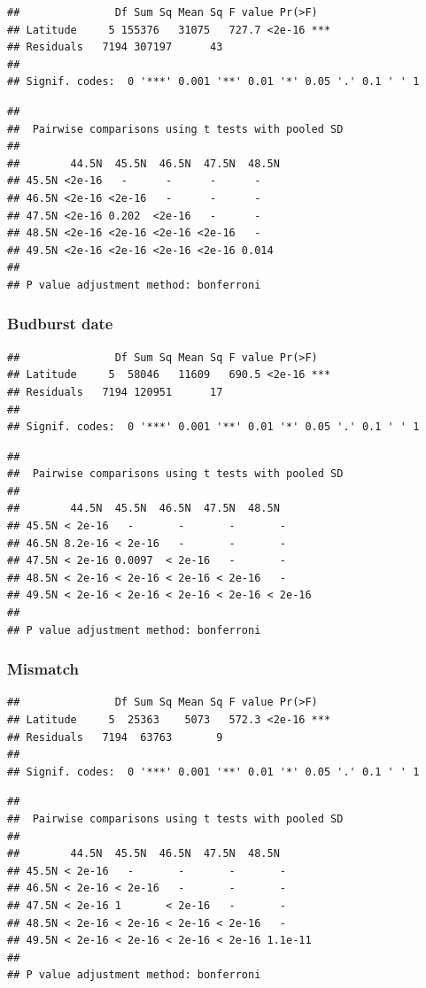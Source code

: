 \documentclass[12 pt]{article}
\begin{document}
\begin{verbatim}
##               Df Sum Sq Mean Sq F value Pr(>F)    
## Latitude     5 155376   31075   727.7 <2e-16 ***
## Residuals   7194 307197      43                   
## 
## Signif. codes:  0 '***' 0.001 '**' 0.01 '*' 0.05 '.' 0.1 ' ' 1
\end{verbatim}

\begin{verbatim}
## 
##  Pairwise comparisons using t tests with pooled SD 
## 
##        44.5N  45.5N  46.5N  47.5N  48.5N
## 45.5N <2e-16   -      -      -      -    
## 46.5N <2e-16 <2e-16   -      -      -    
## 47.5N <2e-16 0.202  <2e-16   -      -    
## 48.5N <2e-16 <2e-16 <2e-16 <2e-16   -    
## 49.5N <2e-16 <2e-16 <2e-16 <2e-16 0.014
## 
## P value adjustment method: bonferroni
\end{verbatim}

\subsubsection*{Budburst date}

\begin{verbatim}
##               Df Sum Sq Mean Sq F value Pr(>F)    
## Latitude     5  58046   11609   690.5 <2e-16 ***
## Residuals   7194 120951      17                   
## 
## Signif. codes:  0 '***' 0.001 '**' 0.01 '*' 0.05 '.' 0.1 ' ' 1
\end{verbatim}

\begin{verbatim}
## 
##  Pairwise comparisons using t tests with pooled SD 
##  
##        44.5N  45.5N  46.5N  47.5N  48.5N
## 45.5N < 2e-16   -       -       -       -      
## 46.5N 8.2e-16 < 2e-16   -       -       -      
## 47.5N < 2e-16 0.0097  < 2e-16   -       -      
## 48.5N < 2e-16 < 2e-16 < 2e-16 < 2e-16   -      
## 49.5N < 2e-16 < 2e-16 < 2e-16 < 2e-16 < 2e-16
## 
## P value adjustment method: bonferroni
\end{verbatim}

\subsubsection*{Mismatch}

\begin{verbatim}
##               Df Sum Sq Mean Sq F value Pr(>F)    
## Latitude     5  25363    5073   572.3 <2e-16 ***
## Residuals   7194  63763       9                   
## 
## Signif. codes:  0 '***' 0.001 '**' 0.01 '*' 0.05 '.' 0.1 ' ' 1
\end{verbatim}

\begin{verbatim}
## 
##  Pairwise comparisons using t tests with pooled SD 
## 
##        44.5N  45.5N  46.5N  47.5N  48.5N  
## 45.5N < 2e-16   -       -       -       -      
## 46.5N < 2e-16 < 2e-16   -       -       -      
## 47.5N < 2e-16 1       < 2e-16   -       -      
## 48.5N < 2e-16 < 2e-16 < 2e-16 < 2e-16   -      
## 49.5N < 2e-16 < 2e-16 < 2e-16 < 2e-16 1.1e-11
## 
## P value adjustment method: bonferroni
\end{verbatim}


\end{document}
